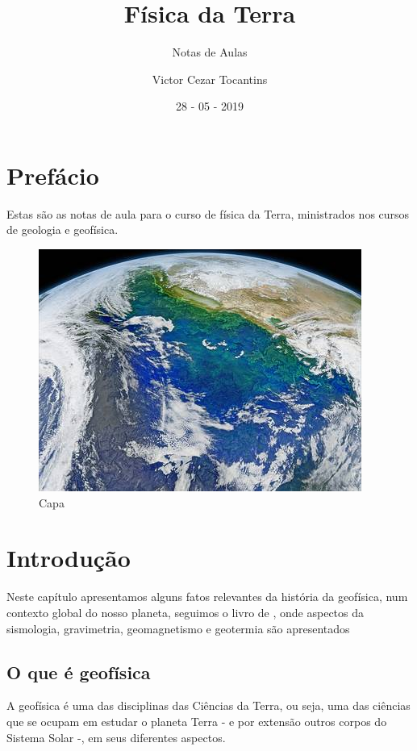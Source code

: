 \documentclass[]{book}
\title{Física da Terra}
\subtitle{Notas de Aulas}
\author{Victor Cezar Tocantins}
\date{28 - 05 - 2019}
\theoremstyle{definition}
\theoremstyle{definition}
\theoremstyle{definition}
\theoremstyle{remark}
\begin{document}
\maketitle

{
\hypersetup{linkcolor=black}
\setcounter{tocdepth}{1}
\tableofcontents
}
\hypertarget{prefacio}{%
\chapter*{Prefácio}\label{prefacio}}

Estas são as notas de aula para o curso de física da Terra, ministrados nos cursos de geologia e geofísica.

\begin{figure}
\centering
\includegraphics{images/cover.jpg}
\caption{Capa}
\end{figure}

\hypertarget{cap01}{%
\chapter{Introdução}\label{cap01}}

Neste capítulo apresentamos alguns fatos relevantes da história da geofísica, num contexto global do nosso planeta, seguimos o livro de \citet{Ribeiro2018}, onde aspectos da sismologia, gravimetria, geomagnetismo e geotermia são apresentados

\hypertarget{o-que-e-geofisica}{%
\section{O que é geofísica}\label{o-que-e-geofisica}}

A geofísica é uma das disciplinas das Ciências da Terra, ou seja, uma das ciências que se ocupam em estudar o planeta Terra - e por extensão outros corpos do Sistema Solar -, em seus diferentes aspectos.
\end{document}
